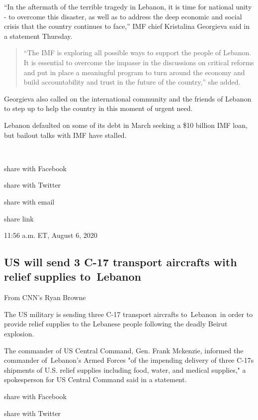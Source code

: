 ``In the aftermath of the terrible tragedy in Lebanon, it is time for
national unity - to overcome this disaster, as well as to address the
deep economic and social crisis that the country continues to face,''
IMF chief Kristalina Georgieva said in a statement Thursday.

\begin{quote}
``The IMF is exploring all possible ways to support the people of
Lebanon. It is essential to overcome the impasse in the discussions on
critical reforms and put in place a meaningful program to turn around
the economy and build accountability and trust in the future of the
country,'' she added.
\end{quote}

Georgieva also called on the international community and the friends of
Lebanon to step up to help the country in this moment of urgent need.

Lebanon defaulted on some of its debt in March seeking a \$10 billion
IMF loan, but bailout talks with IMF have stalled.

~

share with Facebook

share with Twitter

share with email

share link

11:56 a.m. ET, August 6, 2020

\hypertarget{us-will-send-3-c-17-transport-aircrafts-with-relief-supplies-to-lebanon}{%
\subsection{US will send 3 C-17 transport aircrafts with relief supplies
to~Lebanon}\label{us-will-send-3-c-17-transport-aircrafts-with-relief-supplies-to-lebanon}}

From CNN's Ryan Browne

The US military is sending three C-17 transport aircrafts to~Lebanon~in
order to provide relief supplies to the Lebanese people following the
deadly Beirut explosion.

The commander of US Central Command, Gen. Frank Mckenzie, informed the
commander of~Lebanon's Armed Forces "of the impending delivery of three
C-17s shipments of U.S. relief supplies including food, water, and
medical supplies," a spokesperson for US Central Command said in a
statement.

share with Facebook

share with Twitter


